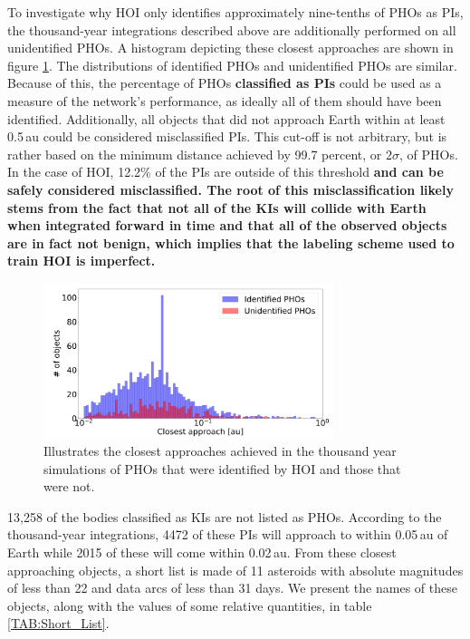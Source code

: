 \documentclass{aa}
\begin{document}
To investigate why HOI only identifies approximately nine-tenths of PHOs as PIs, the thousand-year integrations described above are additionally performed on all unidentified PHOs. A histogram depicting these closest approaches are shown in figure \ref{FIG:Closeness_PHOs}. The distributions of identified PHOs and unidentified PHOs are similar. Because of this, the percentage of PHOs \textbf{classified as PIs} could be used as a measure of the network's performance, as ideally all of them should have been identified. Additionally, all objects that did not approach Earth within at least 0.5\,au could be considered misclassified PIs. This cut-off is not arbitrary, but is rather based on the minimum distance achieved by 99.7 percent, or $2\sigma$, of PHOs. In the case of HOI, 12.2\% of the PIs are outside of this threshold \textbf{ and can be safely considered misclassified. The root of this misclassification likely stems from the fact that not all of the KIs will collide with Earth when integrated forward in time and that all of the observed objects are in fact not benign, which implies that the labeling scheme used to train HOI is imperfect.}
\begin{figure}[h]
    \hspace*{-0.44cm}
	\includegraphics[width=85mm]{images/4_Closeness_Plots_PHOsLog.pdf}
	\centering
	\caption{\label{FIG:Closeness_PHOs} Illustrates the closest approaches achieved in the thousand year simulations of PHOs that were identified by HOI and those that were not.}
\end{figure}

13,258 of the bodies classified as KIs are not listed as PHOs. According to the thousand-year integrations, 4472 of these PIs will approach to within 0.05\,au of Earth while 2015 of these will come within 0.02\,au. From these closest approaching objects, a short list is made of 11 asteroids with absolute magnitudes of less than 22 and data arcs of less than 31 days. We present the names of these objects, along with the values of some relative quantities, in table \ref{TAB:Short_List}.
\end{document}
